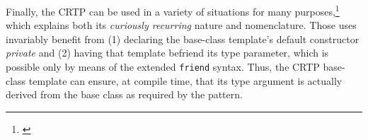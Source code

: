Finally, the CRTP can be used in a variety of situations for many
purposes,\footnote{\cite{fluentcpp17}} which explains both its \emph{curiously recurring} nature and nomenclature. Those uses invariably
benefit from (1) declaring the base-class template's default constructor
\emph{private} and (2) having that template befriend its type parameter,
which is possible only by means of the extended \lstinline!friend! syntax.
Thus, the CRTP base-class template can ensure, at compile time, that its
type argument is actually derived from the base class as required by the
pattern.


